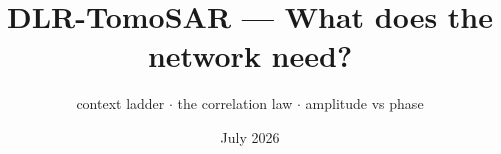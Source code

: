 \documentclass[aspectratio=169,9pt]{beamer}
\title{\textbf{DLR-TomoSAR --- What does the network need?}}
\subtitle{context ladder \; $\cdot$ \; the correlation law \; $\cdot$ \; amplitude vs phase}
\date{\small July 2026}
\author{}
\begin{document}
\begin{frame}[plain]
  \titlepage
\end{frame}


\end{document}
